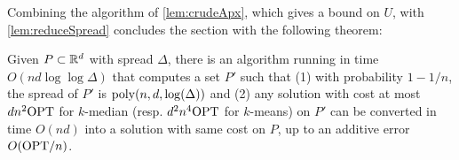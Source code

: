 Combining the algorithm of \cref{lem:crudeApx}, which gives a bound on $U$, with \cref{lem:reduceSpread} concludes the section with the following theorem:

\begin{theorem}
Given $P \subset \mathbb{R}^d$ with spread $\Delta$, there is an algorithm running in time $O(nd \log \log \Delta)$ that computes a set $P'$ such that (1) with probability $1-1/n$, the spread of $P'$ is $\operatorname{poly}(n,d, \log(\Delta))$ and (2) any solution with cost at most $d n^2 \text{OPT}$ for  $k$-median (resp. $d^2 n^4 \text{OPT}$ for $k$-means) on $P'$ can be converted in time $O(nd)$ into a solution with same cost on $P$, up to an additive error $O(\text{OPT} / n)$.
\end{theorem}
